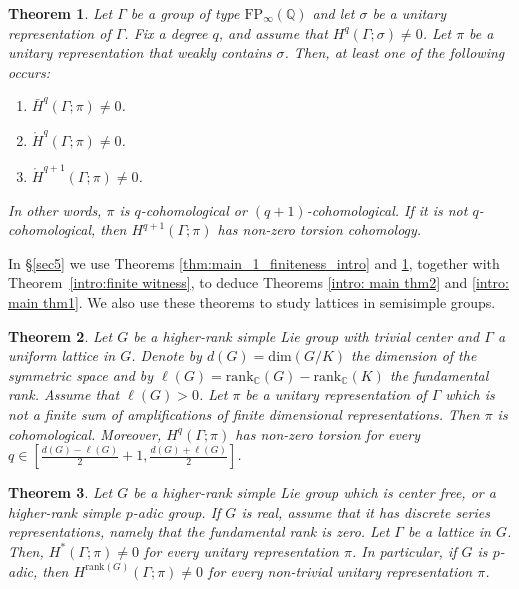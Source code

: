 \documentclass[12pt,reqno]{amsart}
\newcommand{\Q}{\mathbb{Q}}
\newtheorem{mainthm}{Theorem}
\theoremstyle{definition}
\newcommand{\torH}{\mathring{H}}
\begin{document}
\begin{mainthm}\label{thm:main_2_finiteness_intro}
    Let $\Gamma$ be a group of type $\mathrm{FP}_\infty(\Q)$ and let $\sigma$ be a unitary representation of $\Gamma$. Fix a degree $q$, and assume that $H^q(\Gamma;\sigma) \ne 0$. Let $\pi$ be a unitary representation that weakly contains $\sigma$. Then, at least one of the following occurs:
    \begin{enumerate}
        \item  $\bar{H}^q(\Gamma;\pi) \ne 0$.
        \item  $\torH^q(\Gamma;\pi) \ne 0$.
        \item  $\torH^{q+1}(\Gamma;\pi) \ne 0$.
    \end{enumerate}
    In other words, $\pi$ is $q$-cohomological or $(q+1)$-cohomological. If it is not $q$-cohomological, then $H^{q+1}(\Gamma;\pi)$ has non-zero torsion cohomology.
\end{mainthm}

In \S\ref{sec5} we use Theorems \ref{thm:main_1_finiteness_intro} and \ref{thm:main_2_finiteness_intro}, together with Theorem~\ref{intro:finite witness}, to deduce Theorems \ref{intro: main thm2} and \ref{intro: main thm1}. 
We also use these theorems to study lattices in semisimple groups.


\begin{mainthm}\label{intro:latt corollary 1}
    Let $G$ be a higher-rank simple Lie group with trivial center and $\Gamma$ a uniform lattice in $G$. Denote by $d(G)=\mathrm{dim}(G/K)$ the dimension of the symmetric space and by $\ell(G)=\mathrm{rank}_\mathbb{C}(G)-\mathrm{rank}_\mathbb{C}(K)$ the fundamental rank. Assume that $\ell(G)>0$. Let $\pi$ be a unitary representation of $\Gamma$ which is not a finite sum of amplifications of finite dimensional representations. Then $\pi$ is cohomological. Moreover, $H^q(\Gamma;\pi)$ has non-zero torsion for every $q \in [\frac{d(G)-\ell(G)}{2}+1,\frac{d(G)+\ell(G)}{2}]$.
\end{mainthm}
\begin{mainthm}\label{intro:latt corollary 2}
    Let $G$ be a higher-rank simple Lie group which is center free, or a higher-rank simple $p$-adic group. If $G$ is real, assume that it has discrete series representations, namely that the fundamental rank is zero. Let $\Gamma$ be a lattice in $G$. Then, $H^*(\Gamma;\pi) \ne 0$ for every unitary representation $\pi$. In particular, if $G$ is $p$-adic, then $H^{\mathrm{rank}(G)}(\Gamma;\pi)\ne 0$ for every  non-trivial unitary representation $\pi$.
\end{mainthm}
\end{document}
